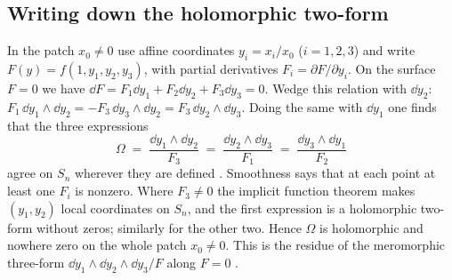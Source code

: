 \subsection{Writing down the holomorphic two-form}

In the patch $x_0\neq0$ use affine coordinates $y_i=x_i/x_0$ ($i=1,2,3$) and write
$F(y)=f(1,y_1,y_2,y_3)$, with partial derivatives $F_i=\partial F/\partial y_i$. On the surface
$F=0$ we have $\dd F=F_1\dd y_1+F_2\dd y_2+F_3\dd y_3=0$. Wedge this relation with $\dd y_2$:
$F_1\,\dd y_1\wedge\dd y_2=-F_3\,\dd y_3\wedge\dd y_2=F_3\,\dd y_2\wedge\dd y_3$. Doing the same
with $\dd y_1$ one finds that the three expressions
\begin{equation}\label{eq:k3:residue}
  \Omega\;=\;\frac{\dd y_1\wedge\dd y_2}{F_3}
        \;=\;\frac{\dd y_2\wedge\dd y_3}{F_1}
        \;=\;\frac{\dd y_3\wedge\dd y_1}{F_2}
\end{equation}
agree on $S_n$ wherever they are defined . Smoothness
says that at each point at least one $F_i$ is nonzero. Where $F_3\neq0$ the implicit function
theorem makes $(y_1,y_2)$ local coordinates on $S_n$, and the first expression is a holomorphic
two-form without zeros; similarly for the other two. Hence $\Omega$ is holomorphic and nowhere
zero on the whole patch $x_0\neq0$. This is the residue of the meromorphic
three-form $\dd y_1\wedge\dd y_2\wedge\dd y_3/F$ along $F=0$ .

